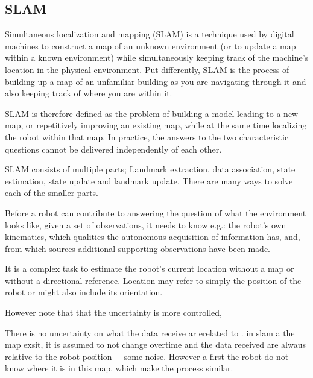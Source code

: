 \subsection{SLAM}

\cite{smith1990estimating} 
\cite{dissanayake2001solution}

Simultaneous localization and mapping (SLAM) is a technique used by digital machines to construct a map of an unknown environment (or to update a map within a known environment) while simultaneously keeping track of the machine's location in the physical environment. Put differently, SLAM is the process of building up a map of an unfamiliar building as you are navigating through it and also keeping track of where you are within it.

SLAM is therefore defined as the problem of building a model leading to a new map, or repetitively improving an existing map, while at the same time localizing the robot within that map. In practice, the answers to the two characteristic questions cannot be delivered independently of each other.

SLAM consists of multiple parts; Landmark extraction, data association, state estimation, state update and landmark update. There are many ways to solve each of the smaller parts.

Before a robot can contribute to answering the question of what the environment looks like, given a set of observations, it needs to know e.g.: the robot's own kinematics, which qualities the autonomous acquisition of information has, and, from which sources additional supporting observations have been made.

It is a complex task to estimate the robot's current location without a map or without a directional reference. Location may refer to simply the position of the robot or might also include its orientation.

However note that that the uncertainty is more controlled, 

There is no uncertainty on what the data receive ar erelated to . in slam a the map exsit, it is assumed to not change overtime and the data received are alwaus relative to the robot position + some noise. However a first the robot do not know where it is in this map. which make the process similar.

